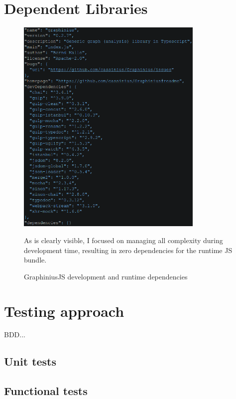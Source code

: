 	
\section{Dependent Libraries}
\label{sect:dep_libraries}

	\begin{figure}[ht]
		\label{fig_dependencies}
		\centering
		\hspace*{-0.5cm}
		\includegraphics[width=0.8\textwidth]{figures/package_deps}
		\caption{GraphiniusJS development and runtime dependencies}
		\small
		As is clearly visible, I focused on managing all complexity during development time, resulting in zero dependencies for the runtime JS bundle.
	\end{figure}



\section{Testing approach}
\label{sect:testing_approach}

	BDD...
	
	\subsection{Unit tests}
	\label{ssect:unittests}
	
	\subsection{Functional tests}
	\label{ssect:func_tests}
	
